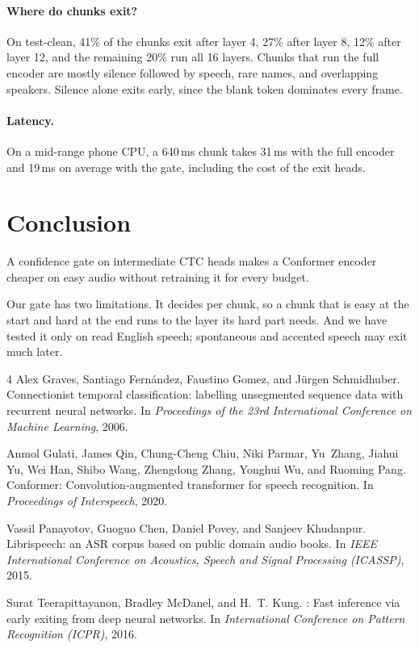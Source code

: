 \documentclass[10pt,twocolumn]{article}
\begin{document}
\paragraph{Where do chunks exit?}
On test-clean, 41\% of the chunks exit after layer 4, 27\% after layer 8, 12\% after layer 12, and the remaining 20\% run all 16 layers.
Chunks that run the full encoder are mostly silence followed by speech, rare names, and overlapping speakers.
Silence alone exits early, since the blank token dominates every frame.

\paragraph{Latency.}
On a mid-range phone CPU, a 640\,ms chunk takes 31\,ms with the full encoder and 19\,ms on average with the gate, including the cost of the exit heads.

\section{Conclusion}

A confidence gate on intermediate CTC heads makes a Conformer encoder cheaper on easy audio without retraining it for every budget.

Our gate has two limitations.
It decides per chunk, so a chunk that is easy at the start and hard at the end runs to the layer its hard part needs.
And we have tested it only on read English speech; spontaneous and accented speech may exit much later.

\begin{thebibliography}{4}
Alex Graves, Santiago Fern{\'a}ndez, Faustino Gomez, and J{\"u}rgen Schmidhuber.
\newblock Connectionist temporal classification: labelling unsegmented sequence data with recurrent neural networks.
\newblock In \emph{Proceedings of the 23rd International Conference on Machine Learning}, 2006.

Anmol Gulati, James Qin, Chung-Cheng Chiu, Niki Parmar, Yu~Zhang, Jiahui Yu, Wei Han, Shibo Wang, Zhengdong Zhang, Yonghui Wu, and Ruoming Pang.
\newblock Conformer: Convolution-augmented transformer for speech recognition.
\newblock In \emph{Proceedings of Interspeech}, 2020.

Vassil Panayotov, Guoguo Chen, Daniel Povey, and Sanjeev Khudanpur.
\newblock Librispeech: an {ASR} corpus based on public domain audio books.
\newblock In \emph{IEEE International Conference on Acoustics, Speech and Signal Processing (ICASSP)}, 2015.

Surat Teerapittayanon, Bradley McDanel, and H.~T. Kung.
: Fast inference via early exiting from deep neural networks.
\newblock In \emph{International Conference on Pattern Recognition (ICPR)}, 2016.
\end{thebibliography}
\end{document}
